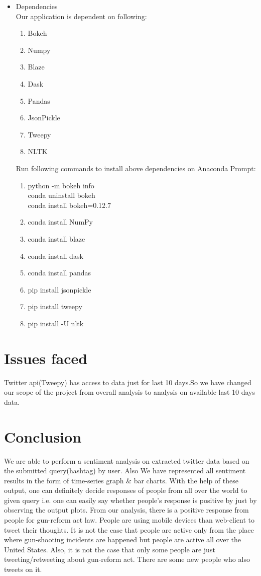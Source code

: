 \documentclass[journal, a4paper]{IEEEtran}
\begin{document}
\begin{itemize}
\begin{enumerate}
	\end{enumerate}
  \item Dependencies\\
  Our application is dependent on following:
  \begin{enumerate}
		\item 	Bokeh
 		\item 	Numpy
		\item	Blaze
		\item	Dask
		\item	Pandas
		\item	JsonPickle	
		\item	Tweepy
		\item	NLTK
\end{enumerate}
Run following commands to install above dependencies on Anaconda Prompt:
	\begin{enumerate}
		\item 	python -m bokeh info \\ conda uninstall bokeh \\ conda install bokeh=0.12.7
 		\item 	conda install NumPy
		\item	conda install blaze
		\item	conda install dask
		\item	conda install pandas
		\item	pip install jsonpickle	
		\item	pip install tweepy
		\item	pip install -U nltk
\end{enumerate}
\end{itemize}

\section{Issues faced}
Twitter api(Tweepy) has access to data just for last 10 days.So we have changed our scope of the project from overall analysis to analysis on available last 10 days data.

\section{Conclusion}
	We are able to perform a sentiment analysis on extracted twitter data based on the submitted query(hashtag) by user. Also We have represented all sentiment results in the form of  time-series graph \& bar charts. With the help of these output, one can definitely decide responses of people from all over the world to given query i.e. one can easily say whether people’s response is positive by just by observing the output plots. From our analysis, there is a positive response from people for gun-reform act law. People are using mobile devices than web-client to tweet their thoughts. It is not the case that people are active only from the place where gun-shooting incidents are happened but people are active all over the United States. Also, it is not the case that only some people are just tweeting/retweeting about gun-reform act. There are some new people who also tweets on it.
\end{document}
